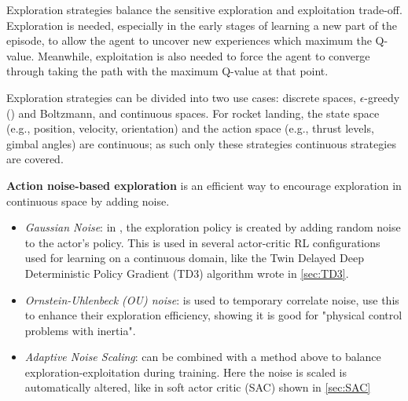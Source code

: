 
Exploration strategies balance the sensitive exploration and exploitation trade-off. Exploration is needed, especially in the early stages of learning a new part of the episode, to allow the agent to uncover new experiences which maximum the Q-value. Meanwhile, exploitation is also needed to force the agent to converge through taking the path with the maximum Q-value at that point.

Exploration strategies can be divided into two use cases: discrete spaces, $\epsilon$-greedy (\cite{sutton1998reinforcement}) and Boltzmann, and continuous spaces. For rocket landing, the state space (e.g., position, velocity, orientation) and the action space (e.g., thrust levels, gimbal angles) are continuous; as such only these strategies continuous strategies are covered.

\textbf{Action noise-based exploration} is an efficient way to encourage exploration in continuous space by adding noise.
\begin{itemize}
    \item \textit{Gaussian Noise}: in \cite{lillicrap2015continuous}, the exploration policy is created by adding random noise to the actor's policy. This is used in several actor-critic RL configurations used for learning on a continuous domain, like the Twin Delayed Deep Deterministic Policy Gradient (TD3) algorithm wrote in \autoref{sec:TD3}.

    \item \textit{Ornstein-Uhlenbeck (OU) noise}: is used to temporary correlate noise, \cite{lillicrap2015continuous} use this to enhance their exploration efficiency, showing it is good for "physical control problems with inertia".

    \item \textit{Adaptive Noise Scaling}: can be combined with a method above to balance exploration-exploitation during training. Here the noise is scaled is automatically altered, like in soft actor critic (SAC) shown in \autoref{sec:SAC}
\end{itemize}

